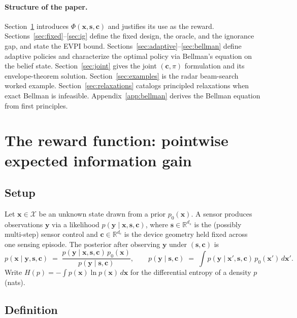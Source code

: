 \documentclass[11pt,a4paper]{article}
\newcommand{\R}{\mathbb{R}}
\begin{document}
\paragraph{Structure of the paper.}
Section~\ref{sec:reward} introduces $\Phi(\bm{x}, \bm{s}, \bm{c})$ and justifies its use as the reward.  Sections~\ref{sec:fixed}--\ref{sec:ig} define the fixed design, the oracle, and the ignorance gap, and state the EVPI bound.  Sections~\ref{sec:adaptive}--\ref{sec:bellman} define adaptive policies and characterize the optimal policy via Bellman's equation on the belief state.  Section~\ref{sec:joint} gives the joint $(\bm{c}, \pi)$ formulation and its envelope-theorem solution.  Section~\ref{sec:examples} is the radar beam-search worked example.  Section~\ref{sec:relaxations} catalogs principled relaxations when exact Bellman is infeasible.  Appendix~\ref{app:bellman} derives the Bellman equation from first principles.

\section{The reward function: pointwise expected information gain}
\label{sec:reward}

\subsection{Setup}

Let $\bm{x} \in \mathcal{X}$ be an unknown state drawn from a prior $p_0(\bm{x})$.  A sensor produces observations $\bm{y}$ via a likelihood $p(\bm{y} \mid \bm{x}, \bm{s}, \bm{c})$, where $\bm{s} \in \R^{d_s}$ is the (possibly multi-step) sensor control and $\bm{c} \in \R^{d_c}$ is the device geometry held fixed across one sensing episode.  The posterior after observing $\bm{y}$ under $(\bm{s}, \bm{c})$ is
\begin{equation}
  p(\bm{x} \mid \bm{y}, \bm{s}, \bm{c}) \;=\; \frac{p(\bm{y} \mid \bm{x}, \bm{s}, \bm{c})\, p_0(\bm{x})}{p(\bm{y} \mid \bm{s}, \bm{c})},
  \qquad
  p(\bm{y} \mid \bm{s}, \bm{c}) \;=\; \int p(\bm{y} \mid \bm{x}', \bm{s}, \bm{c})\, p_0(\bm{x}')\, d\bm{x}'.
\end{equation}
Write $H(p) = -\int p(\bm{x}) \ln p(\bm{x})\, d\bm{x}$ for the differential entropy of a density $p$ (nats).

\subsection{Definition}
\end{document}
